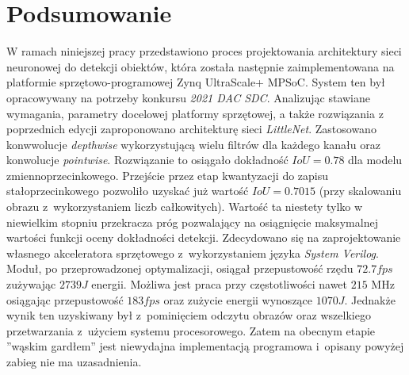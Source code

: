 \chapter{Podsumowanie}
\label{cha:Podsumowanie}


W ramach niniejszej pracy przedstawiono proces projektowania architektury sieci neuronowej do detekcji obiektów, która została następnie zaimplementowana na platformie sprzętowo-programowej Zynq UltraScale+ MPSoC.
System ten był opracowywany na potrzeby konkursu \emph{2021 DAC SDC}. 
Analizując stawiane wymagania, parametry docelowej platformy sprzętowej, a także rozwiązania z poprzednich edycji zaproponowano architekturę sieci \emph{LittleNet}.
Zastosowano konwwolucje \emph{depthwise} wykorzystującą wielu filtrów dla każdego kanału oraz konwolucje \emph{pointwise}.
Rozwiązanie to osiągało dokładność $IoU = 0.78$ dla modelu zmiennoprzecinkowego.
Przejście przez etap kwantyzacji do zapisu stałoprzecinkowego pozwoliło uzyskać już wartość $IoU = 0.7015$ (przy skalowaniu obrazu z~wykorzystaniem liczb całkowitych).
Wartość ta niestety tylko w niewielkim stopniu przekracza próg pozwalający na osiągnięcie maksymalnej wartości funkcji oceny dokładności detekcji.
Zdecydowano się na zaprojektowanie własnego akceleratora sprzętowego z~wykorzystaniem języka \emph{System Verilog}. 
Moduł, po przeprowadzonej optymalizacji, osiągał przepustowość rzędu $72.7 fps$ zużywając $2739 J$ energii.
Możliwa jest praca przy częstotliwości nawet $215$ MHz osiągając przepustowość $183 fps$ oraz zużycie energii wynoszące $1070 J$. 
Jednakże wynik ten uzyskiwany był z~pominięciem odczytu obrazów oraz wszelkiego przetwarzania z~użyciem systemu procesorowego.
Zatem na obecnym etapie ''wąskim gardłem'' jest niewydajna implementacją programowa
i~opisany powyżej zabieg nie ma uzasadnienia.

